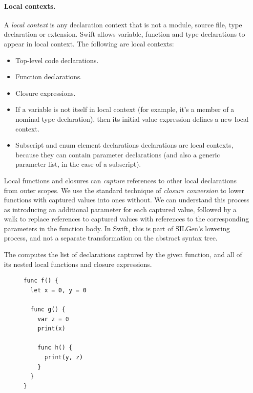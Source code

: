 \documentclass[../generics]{subfiles}
\begin{document}
\paragraph{Local contexts.}
A \emph{local context} is any declaration context that is not a module, source file, type declaration or extension. Swift allows variable, function and type declarations to appear in local context. The following are local contexts:
\begin{itemize}
\item {}Top-level code declarations.
\item Function declarations.
\item {}Closure expressions.
\item If a variable is not itself in local context (for example, it's a member of a nominal type declaration), then its initial value expression defines a new local context.
\item {}Subscript and enum element declarations declarations are local contexts, because they can contain parameter declarations (and also a generic parameter list, in the case of a subscript).
\end{itemize}

Local functions and closures can \emph{capture} references to other local declarations from outer scopes. We use the standard technique of \emph{closure conversion} to lower functions with captured values into ones without. We can understand this process as introducing an additional parameter for each captured value, followed by a walk to replace references to captured values with references to the corresponding parameters in the function body. In Swift, this is part of SILGen's lowering process, and not a separate transformation on the abstract syntax tree.

The  computes the list of declarations captured by the given function, and all of its nested local functions and closure expressions.

\begin{figure}
  \begin{minipage}{10.5em}
\begin{Verbatim}
func f() {
  let x = 0, y = 0

  func g() {
    var z = 0
    print(x)

    func h() {
      print(y, z)
    }
  }
}
\end{Verbatim}
\end{minipage}
\end{figure}
\end{document}
